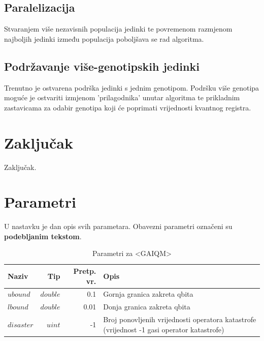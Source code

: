 \documentclass[times, utf8, zavrsni]{fer}
\begin{document}
\section{Paralelizacija}
Stvaranjem više nezavisnih populacija jedinki te povremenom razmjenom najboljih jedinki između populacija poboljšava se rad algoritma.

\section{Podržavanje više-genotipskih jedinki}
Trenutno je ostvarena podrška jedinki s jednim genotipom. Podršku više genotipa moguće je ostvariti izmjenom 'prilagodnika' unutar algoritma te prikladnim zastavicama za odabir genotipa koji će poprimati vrijednosti kvantnog registra.

\chapter{Zaključak}
Zaključak.




\appendix
\chapter{Parametri}
U nastavku je dan opis svih parametara. Obavezni parametri označeni su \textbf{podebljanim tekstom}.

\begin{table}[htb]
\caption{Parametri za <GAIQM>}
\label{tbl:param_gaiqm}
\centering
\begin{tabular}{|p{2cm}|r|r|p{8cm}|} \hline
Naziv & Tip & Pretp. vr. & Opis\\ \hline
$ubound$ & $double$ & 0.1 & Gornja granica zakreta qbita \\
$lbound$ & $double$ & 0.01 & Donja granica zakreta qbita \\
$disaster$ & $uint$ & -1 & Broj ponovljenih vrijednosti operatora katastrofe (vrijednost -1 gasi operator katastrofe) \\ \hline
\end{tabular}
\end{table}
\end{document}
